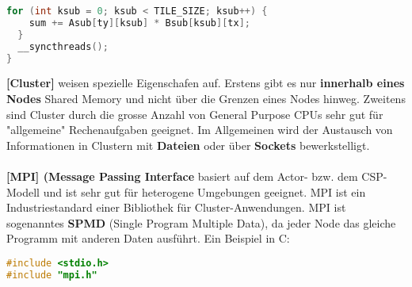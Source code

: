 \documentclass[8pt]{extarticle}
\let\oldtextbf\textbf
\renewcommand{\textbf}{\tiny\oldtextbf}
\begin{document}
\begin{multicols*}{5}
\begin{lstlisting}[language=c]
  for (int ksub = 0; ksub < TILE_SIZE; ksub++) {
    sum += Asub[ty][ksub] * Bsub[ksub][tx];
  }
  __syncthreads();
}
\end{lstlisting}
\textbf{[Cluster]} weisen spezielle Eigenschafen auf. Erstens gibt es nur \textbf{innerhalb eines Nodes} Shared Memory und nicht über die Grenzen eines Nodes hinweg. Zweitens sind Cluster durch die grosse Anzahl von General Purpose CPUs sehr gut für "allgemeine" Rechenaufgaben geeignet. Im Allgemeinen wird der Austausch von Informationen in Clustern mit \textbf{Dateien} oder über \textbf{Sockets} bewerkstelligt.\\\\
\textbf{[MPI] (Message Passing Interface} basiert auf dem Actor- bzw. dem CSP-Modell und ist sehr gut für heterogene Umgebungen geeignet. MPI ist ein Industriestandard einer Bibliothek für Cluster-Anwendungen. MPI ist sogenanntes \textbf{SPMD} (Single Program Multiple Data), da jeder Node das gleiche Programm mit anderen Daten ausführt. Ein Beispiel in C:
\begin{lstlisting}[language=c]
#include <stdio.h>
#include "mpi.h"


\end{lstlisting}
\end{multicols*}
\end{document}
